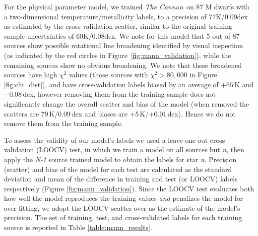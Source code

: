 \documentclass[twocolumn]{aastex62}
\newcommand{\thecannon}{\textsl{The Cannon}}
\begin{document}
For the physical parameter model, we trained \thecannon\ on 87 M dwarfs with a two-dimensional temperature/metallicity labels, to a precision of 77K/0.09dex as estimated by the cross validation scatter, similar to the original training sample uncertainties of 60K/0.08dex. We note for this model that 5 out of 87 sources show possible rotational line broadening identified by visual inspection (as indicated by the red circles in Figure~\ref{fig:mann_validation}), while the remaining sources show no obvious broadening. We note that these broadened sources have high $\chi^2$ values (those sources with $\chi^2 > 80,000$ in Figure \ref{fig:chi_dist}), and have cross-validation labels biased by an average of $+65\,$K and $-0.08\,$dex, however removing them from the training sample does not significantly change the overall scatter and bias of the model (when removed the scatters are 79\,K/0.09\,dex and biases are +5\,K/+0.01\,dex). Hence we do not remove them from the training sample.

To assess the validity of our model's labels we used a leave-one-out cross validation (LOOCV) test, in which we train a model on all sources but \emph{n}, then apply the \emph{N-1} source trained model to obtain the labels for star \emph{n}. Precision (scatter) and bias of the model for each test are calculated as the standard deviation and mean of the difference in training and test (or LOOCV) labels respectively (Figure \ref{fig:mann_validation}). Since the LOOCV test evaluates both how well the model reproduces the training values \emph{and} penalizes the model for over-fitting, we adopt the LOOCV scatter over as the estimate of the model's precision. The set of training, test, and cross-validated labels for each training source is reported in Table \ref{table:mann_results}.
\end{document}
